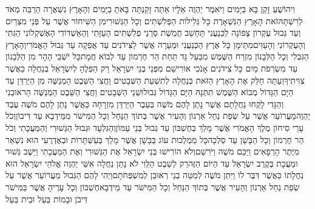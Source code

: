 \documentclass[../main/main.tex]{subfiles}
\begin{document}
\begin{multicols*}{\ncols}
וִיהוֹשֻׁעַ זָקֵן בָּא בַּיָּמִים וַיֹּאמֶר יַהְוֶה אֵלָיו אַתָּה זָקַנְתָּה בָּאתָ בַיָּמִים וְהָאָרֶץ נִשְׁאֲרָה הַרְבֵּה מְאֹד לְרִשְׁתָּהּ\PreVerseSpace{}זֹאת הָאָרֶץ הַנִּשְׁאָרֶת כָּל גְּלִילוֹת הַפְּלִשְׁתִּים וְכָל הַגְּשׁוּרִי\PreVerseSpace{}מִן הַשִּׁיחוֹר אֲשֶׁר עַל פְּנֵי מִצְרַיִם וְעַד גְּבוּל עֶקְרוֹן צָפוֹנָה לַכְּנַעֲנִי תֵּחָשֵׁב חֲמֵשֶׁת סַרְנֵי פְלִשְׁתִּים הָעַזָּתִי וְהָאַשְׁדּוֹדִי הָאֶשְׁקְלוֹנִי הַגִּתִּי וְהָעֶקְרוֹנִי וְהָעַוִּים\PreVerseSpace{}מִתֵּימָן כָּל אֶרֶץ הַכְּנַעֲנִי וּמְעָרָה אֲשֶׁר לַצִּידֹנִים עַד אֲפֵקָה עַד גְּבוּל הָאֱמֹרִי\PreVerseSpace{}וְהָאָרֶץ הַגִּבְלִי וְכָל הַלְּבָנוֹן מִזְרַח הַשֶּׁמֶשׁ מִבַּעַל גָּד תַּחַת הַר חֶרְמוֹן עַד לְבוֹא חֲמָת\PreVerseSpace{}כָּל יֹשְׁבֵי הָהָר מִן הַלְּבָנוֹן עַד מִשְׂרְפֹת מַיִם כָּל צִידֹנִים אָנֹכִי אוֹרִישֵׁם מִפְּנֵי בְּנֵי יִשְׂרָאֵל רַק הַפִּלֶהָ לְיִשְׂרָאֵל בְּנַחֲלָה כַּאֲשֶׁר צִוִּיתִיךָ\PreVerseSpace{}וְעַתָּה חַלֵּק אֶת הָאָרֶץ הַזֹּאת בְּנַחֲלָה לְתִשְׁעַת הַשְּׁבָטִים וַחֲצִי הַשֵּׁבֶט הַמְנַשֶּׁה מִן הַיַּרְדֵּן עַד הַיָּם הַגָּדוֹל מְבוֹא הַשֶּׁמֶשׁ תִּתְּנָהּ הַיָּם הַגָּדוֹל גְּבוּל\PreVerseSpace{}וּשְׁנֵי הַשְּׁבָטִים וַחֲצִי הַשֵּׁבֶט הַמְנַשֶּׁה\SubEnd{} הָראוּבֵנִי וְהַגָּדִי לָקְחוּ נַחֲלָתָם אֲשֶׁר נָתַן לָהֶם מֹשֶׁה בְּעֵבֶר הַיַּרְדֵּן מִזְרָחָה כַּאֲשֶׁר נָתַן לָהֶם מֹשֶׁה עֶבֶד יַהְוֶה\PreVerseSpace{}מֵעֲרוֹעֵר אֲשֶׁר עַל שְׂפַת נַחַל אַרְנוֹן וְהָעִיר אֲשֶׁר בְּתוֹךְ הַנַּחַל וְכָל הַמִּישֹׁר מִמֵּידְבָא\SubEnd{} עַד דִּיבוֹן\PreVerseSpace{}וְכֹל עָרֵי סִיחוֹן מֶלֶךְ הָאֱמֹרִי אֲשֶׁר מָלַךְ בְּחֶשְׁבּוֹן עַד גְּבוּל בְּנֵי עַמּוֹן\PreVerseSpace{}וְהַגִּלְעָד וּגְבוּל הַגְּשׁוּרִי וְהַמַּעֲכָתִי וְכֹל הַר חֶרְמוֹן וְכָל הַבָּשָׁן עַד סַלְכָה\PreVerseSpace{}כָּל מַמְלְכוּת עוֹג בַּבָּשָׁן אֲשֶׁר מָלַךְ בְּעַשְׁתָּרוֹת וּבְאֶדְרֶעִי הוּא נִשְׁאַר מִיֶּתֶר הָרְפָאִים וַיַּכֵּם מֹשֶׁה וַיֹּרִשֵׁם\PreVerseSpace{}וְלֹא הוֹרִישׁוּ בְּנֵי יִשְׂרָאֵל אֶת הַגְּשׁוּרִי וְאֶת הַמַּעֲכָתִי וַיֵּשֶׁב גְּשׁוּר וּמַעֲכָת בְּקֶרֶב יִשְׂרָאֵל עַד הַיּוֹם הַזֶּה\PreVerseSpace{}רַק לְשֵׁבֶט הַלֵּוִי לֹא נָתַן נַחֲלָה אִשֵּׁי יַהְוֶה אֱלֹהֵי יִשְׂרָאֵל הוּא נַחֲלָתוֹ כַּאֲשֶׁר דִּבֶּר לוֹ \ClosedSection{}וַיִּתֵּן מֹשֶׁה לְמַטֵּה בְנֵי רְאוּבֵן לְמִשְׁפְּחֹתָם\PreVerseSpace{}וַיְהִי לָהֶם הַגְּבוּל מֵעֲרוֹעֵר אֲשֶׁר עַל שְׂפַת נַחַל אַרְנוֹן וְהָעִיר אֲשֶׁר בְּתוֹךְ הַנַּחַל וְכָל הַמִּישֹׁר עַד\SubEnd{} מֵידְבָא\PreVerseSpace{}חֶשְׁבּוֹן וְכָל עָרֶיהָ אֲשֶׁר בַּמִּישֹׁר דִּיבֹן וּבָמוֹת בַּעַל וּבֵית בַּעַל 
\end{multicols*}
\end{document}
